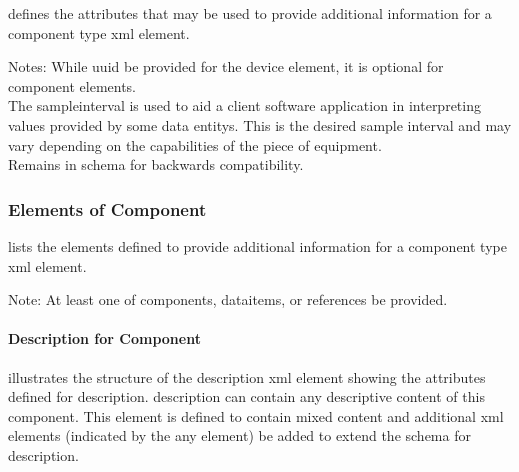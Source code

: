  defines the attributes that may be used to provide additional information for a \gls{component} type \gls{xml} element.



\begin{note}
Notes: \notesign While \gls{uuid} \must be provided for the \gls{device} element, it is optional for \gls{component} elements.\\\notesign \notesign The \gls{sampleinterval} is used to aid a client software application in interpreting values provided by some \glspl{data entity}.  This is the desired sample interval and may vary depending on the capabilities of the piece of equipment.\\\notesign \notesign \notesign Remains in schema for backwards compatibility.

\end{note}

\subsubsection{Elements of Component}

 lists the elements defined to provide additional information for a \gls{component} type \gls{xml} element.



\begin{note}
    Note: \notesign At least one of \gls{components}, \gls{dataitems}, or \gls{references} \must be provided.

\end{note}

\paragraph{Description for Component}\mbox{}

 illustrates the structure of the \gls{description} \gls{xml} element showing the attributes defined for \gls{description}.  \gls{description} can contain any descriptive content of this \gls{component}.  This element is defined to contain mixed content and additional \gls{xml} elements (indicated by the \gls{any} element) \may be added to extend the schema for \gls{description}.

